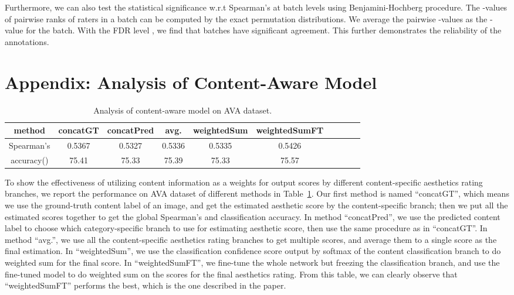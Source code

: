 \documentclass[runningheads]{llncs}
\begin{document}
Furthermore,
we can also test the statistical significance w.r.t Spearman's  at batch levels using Benjamini-Hochberg procedure.
The -values of pairwise ranks of raters in a batch can be computed by the exact permutation distributions.
We average the pairwise -values as the -value for the batch.
With the FDR level ,
we find that  batches have significant agreement.
This further demonstrates the reliability of the annotations.

\section*{Appendix: Analysis of Content-Aware Model}
\label{sec:contAwareModelAnalysis}
\begin{table}
\caption{Analysis of content-aware model on AVA dataset.}
  \centering
  \begin{tabular}{ | c| c | c| c| c| c| c| c| c| c| }
     \hline
         method        & concatGT & concatPred & avg. & weightedSum & weightedSumFT \\
     \hline\hline
     Spearman's  & 0.5367  &  0.5327 & 0.5336  & 0.5335 & 0.5426  \\
     accuracy()    & 75.41   & 75.33   & 75.39   & 75.33  & 75.57   \\
     \hline
   \end{tabular}
\label{tab:contAwareModelAnalysis}
\end{table}
To show the effectiveness of utilizing content information as a weights for output scores by different content-specific aesthetics rating branches,
we report the performance on AVA dataset of different methods in  Table~\ref{tab:contAwareModelAnalysis}.
Our first method is named ``concatGT'',
which means we use the ground-truth content label of an image,
and get the estimated aesthetic score by the content-specific branch;
then we put all the estimated scores together to get the global Spearman's  and classification accuracy.
In method ``concatPred'',
we use the predicted content label to choose which category-specific branch to use for estimating aesthetic score,
then use the same procedure as in ``concatGT''.
In method ``avg.'',
we use all the content-specific aesthetics rating branches to get multiple scores,
and average them to a single score as the final estimation.
In ``weightedSum'',
we use the classification confidence score output by softmax of the content classification branch to do weighted sum for the final score.
In ``weightedSumFT'',
we fine-tune the whole network but freezing the classification branch,
and use the fine-tuned model to do weighted sum on the scores for the final aesthetics rating.
From this table,
we can clearly observe that ``weightedSumFT'' performs the best,
which is the one described in the paper.
\end{document}
